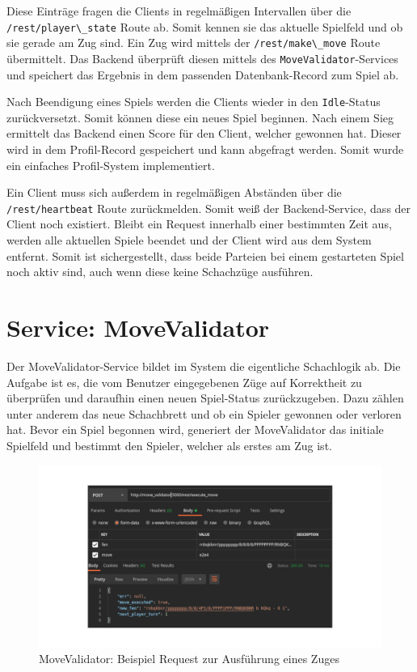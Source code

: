 Diese Einträge fragen die Clients in regelmäßigen Intervallen über die
\passthrough{\lstinline!/rest/player\_state!} Route ab. Somit kennen sie
das aktuelle Spielfeld und ob sie gerade am Zug sind. Ein Zug wird
mittels der \passthrough{\lstinline!/rest/make\_move!} Route
übermittelt. Das Backend überprüft diesen mittels des
\passthrough{\lstinline!MoveValidator!}-Services und speichert das
Ergebnis in dem passenden Datenbank-Record zum Spiel ab.

Nach Beendigung eines Spiels werden die Clients wieder in den
\passthrough{\lstinline!Idle!}-Status zurückversetzt. Somit können diese
ein neues Spiel beginnen. Nach einem Sieg ermittelt das Backend einen
Score für den Client, welcher gewonnen hat. Dieser wird in dem
Profil-Record gespeichert und kann abgefragt werden. Somit wurde ein
einfaches Profil-System implementiert.

Ein Client muss sich außerdem in regelmäßigen Abständen über die
\passthrough{\lstinline!/rest/heartbeat!} Route zurückmelden. Somit weiß
der Backend-Service, dass der Client noch existiert. Bleibt ein Request
innerhalb einer bestimmten Zeit aus, werden alle aktuellen Spiele
beendet und der Client wird aus dem System entfernt. Somit ist
sichergestellt, dass beide Parteien bei einem gestarteten Spiel noch
aktiv sind, auch wenn diese keine Schachzüge ausführen.

\hypertarget{service-movevalidator}{%
\section{Service: MoveValidator}\label{service-movevalidator}}

Der MoveValidator-Service bildet im System die eigentliche Schachlogik
ab. Die Aufgabe ist es, die vom Benutzer eingegebenen Züge auf
Korrektheit zu überprüfen und daraufhin einen neuen Spiel-Status
zurückzugeben. Dazu zählen unter anderem das neue Schachbrett und ob ein
Spieler gewonnen oder verloren hat. Bevor ein Spiel begonnen wird,
generiert der MoveValidator das initiale Spielfeld und bestimmt den
Spieler, welcher als erstes am Zug ist.

\begin{figure}
\centering
\includegraphics{images/ATC_movevalidator_execute_move.png}
\caption{MoveValidator: Beispiel Request zur Ausführung eines
Zuges\label{ATC_movevalidator_execute_move}}
\end{figure}

